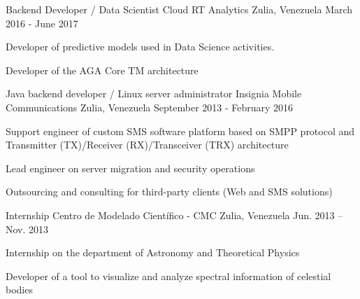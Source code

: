 \begin{cventries}
    \cventry
    {Backend Developer / Data Scientist}
    {Cloud RT Analytics}
    {Zulia, Venezuela}
    {March 2016 - June 2017}
    {
        \begin{cvitems}
            \item {Developer of predictive models used in Data Science activities.}
            \item {Developer of the AGA Core TM architecture}
        \end{cvitems}
    }

    \cventry
    {Java backend developer / Linux server administrator}
    {Insignia Mobile Communications}
    {Zulia, Venezuela}
    {September 2013 - February 2016}
    {
        \begin{cvitems}
            \item {Support engineer of custom SMS software platform based on SMPP protocol
            and Transmitter (TX)/Receiver (RX)/Transceiver (TRX) architecture}
            \item {Lead engineer on server migration and security operations}
            \item {Outsourcing and consulting for third-party clients (Web and SMS solutions)}
        \end{cvitems}
    }

    \cventry
    {Internship}
    {Centro de Modelado Científico - CMC}
    {Zulia, Venezuela}
    {Jun. 2013 – Nov. 2013}
    {
        \begin{cvitems}
            \item {Internship on the department of Astronomy and Theoretical Physics }
            \item {Developer of a tool to visualize and analyze spectral information of celestial bodies}
        \end{cvitems}
    }
\end{cventries}
